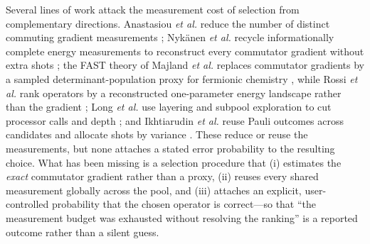 \documentclass[aps,pra,reprint,superscriptaddress,nofootinbib,floatfix]{revtex4-2}
\begin{document}
Several lines of work attack the measurement cost of selection from complementary directions. Anastasiou \emph{et al.} reduce the number of distinct commuting gradient measurements \cite{anastasiou2023gradients}; Nyk\"anen \emph{et al.} recycle informationally complete energy measurements to reconstruct every commutator gradient without extra shots \cite{nykanen2025ic}; the FAST theory of Majland \emph{et al.} replaces commutator gradients by a sampled determinant-population proxy for fermionic chemistry \cite{majland2023fast}, while Rossi \emph{et al.} rank operators by a reconstructed one-parameter energy landscape rather than the gradient \cite{rossi2026energy}; Long \emph{et al.} use layering and subpool exploration to cut processor calls and depth \cite{long2024layering}; and Ikhtiarudin \emph{et al.} reuse Pauli outcomes across candidates and allocate shots by variance \cite{ikhtiarudin2025shot}. These reduce or reuse the measurements, but none attaches a stated error probability to the resulting choice. What has been missing is a selection procedure that (i) estimates the \emph{exact} commutator gradient rather than a proxy, (ii) reuses every shared measurement globally across the pool, and (iii) attaches an explicit, user-controlled probability that the chosen operator is correct---so that ``the measurement budget was exhausted without resolving the ranking'' is a reported outcome rather than a silent guess.
\end{document}
